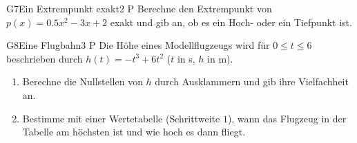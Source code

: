 \documentclass[11pt]{article}
\begin{document}
\begin{lpaufgabe}{G7}{Ein Extrempunkt exakt}{2 P}
Berechne den Extrempunkt von $p(x) = 0.5x^{2} - 3x + 2$ exakt und gib an, ob es ein Hoch- oder ein Tiefpunkt ist.
\end{lpaufgabe}

\begin{lpaufgabe}{G8}{Eine Flugbahn}{3 P}
Die Höhe eines Modellflugzeugs wird für $0 \le t \le 6$ beschrieben durch $h(t) = -t^{3} + 6t^{2}$ ($t$ in s, $h$ in m).
\begin{enumerate}[label=(\alph*),leftmargin=*,itemsep=1pt]
\item Berechne die Nullstellen von $h$ durch Ausklammern und gib ihre Vielfachheit an.
\item Bestimme mit einer Wertetabelle (Schrittweite $1$), wann das Flugzeug in der Tabelle am höchsten ist und wie hoch es dann fliegt.
\end{enumerate}
\end{lpaufgabe}
\end{document}
